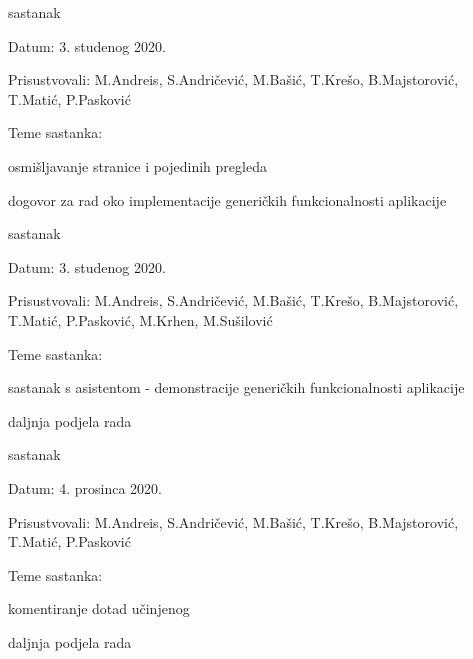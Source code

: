 \begin{packed_enum}
	\item  sastanak
	\item[] \begin{packed_item}
		\item Datum: 3. studenog 2020.
		\item Prisustvovali: M.Andreis, S.Andričević, M.Bašić, T.Krešo, B.Majstorović, T.Matić, P.Pasković
		\item Teme sastanka:
		\begin{packed_item}
			\item osmišljavanje stranice i pojedinih pregleda
			\item  dogovor za rad oko implementacije generičkih funkcionalnosti aplikacije
		\end{packed_item}
	\end{packed_item}

\item  sastanak
\item[] \begin{packed_item}
	\item Datum: 3. studenog 2020.
	\item Prisustvovali: M.Andreis, S.Andričević, M.Bašić, T.Krešo, B.Majstorović, T.Matić, P.Pasković, M.Krhen, M.Sušilović
	\item Teme sastanka:
	\begin{packed_item}
		\item sastanak s asistentom - demonstracije generičkih funkcionalnosti aplikacije
		\item daljnja podjela rada
	\end{packed_item}
\end{packed_item}

\item  sastanak
\item[] \begin{packed_item}
	\item Datum: 4. prosinca 2020.
	\item Prisustvovali: M.Andreis, S.Andričević, M.Bašić, T.Krešo, B.Majstorović, T.Matić, P.Pasković
	\item Teme sastanka:
	\begin{packed_item}
		\item komentiranje dotad učinjenog
		\item daljnja podjela rada
	\end{packed_item}
\end{packed_item}


\end{packed_enum}

